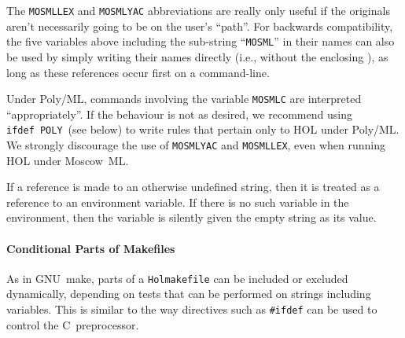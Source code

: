 The \texttt{MOSMLLEX} and \texttt{MOSMLYAC} abbreviations are really
only useful if the originals aren't necessarily going to be on the
user's ``path''.  For backwards compatibility, the five variables
above including the sub-string ``\texttt{MOSML}'' in their names can
also be used by simply writing their names directly (i.e., without the
enclosing \varref{\dots}), as long as these references occur first on
a command-line.

Under Poly/ML, commands involving the variable \texttt{MOSMLC} are interpreted ``appropriately''.
If the behaviour is not as desired, we recommend using \texttt{ifdef~POLY}~(see below) to write rules that pertain only to HOL under Poly/ML.
We strongly discourage the use of \texttt{MOSMLYAC} and \texttt{MOSMLLEX}, even when running HOL under Moscow~ML.

If a reference is made to an otherwise undefined string, then it is
treated as a reference to an environment variable.  If there is no
such variable in the environment, then the variable is silently given
the empty string as its value.

\paragraph{Conditional Parts of Makefiles}
As in GNU~\textsf{make}, parts of a \texttt{Holmakefile} can be included or excluded dynamically, depending on tests that can be performed on strings including variables.
%
This is similar to the way directives such as \texttt{\#ifdef} can be used to control the C~preprocessor.

